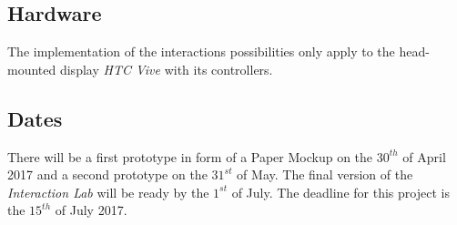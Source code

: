 \documentclass[a4paper, 12pt]{article}
\begin{document}
\subsection{Hardware}

The implementation of the interactions possibilities only apply to the head-mounted display \textit{HTC Vive} with its controllers. 

\subsection{Dates}
There will be a first prototype in form of a Paper Mockup on the $30^{th}$ of April 2017 and a second prototype on the $31^{st}$ of May. 
The final version of the \textit{Interaction Lab} will be ready by the $1^{st}$ of July. The deadline for this project is the $15^{th}$ of July 2017.
\end{document}
